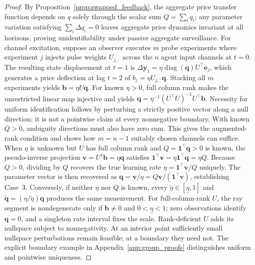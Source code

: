 \documentclass[10pt,twocolumn,letterpaper]{article}
\theoremstyle{definition}
\theoremstyle{remark}
\begin{document}
\begin{proof}
By Proposition~\ref{prop:swapped_feedback}, the aggregate price transfer function depends on $q$ solely through the scalar sum $Q = \sum_i q_i$; any parameter variation satisfying $\sum_i \Delta q_i = 0$ leaves aggregate price dynamics invariant at all horizons, proving unidentifiability under passive aggregate surveillance.
For channel excitation, suppose an observer executes $m$ probe experiments where experiment $j$ injects pulse weights $U_{j,:}$ across the $n$ agent input channels at $t=0$. The resulting state displacement at $t=1$ is $\Delta \mathbf{y}_1 = \eta \operatorname{diag}(\mathbf{q}) U^\top \mathbf{e}_j$, which generates a price deflection at lag $t=2$ of $b_j = \eta U_{j,:} \mathbf{q}$. Stacking all $m$ experiments yields $\mathbf{b} = \eta U \mathbf{q}$.
For known $\eta>0$, full column rank makes the unrestricted linear map injective and yields $\mathbf q=\eta^{-1}(U^\top U)^{-1}U^\top\mathbf b$. Necessity for uniform identification follows by perturbing a strictly positive vector along a null direction; it is not a pointwise claim at every nonnegative boundary. With known $Q>0$, ambiguity directions must also have zero sum. This gives the augmented-rank condition and shows how $m=n-1$ suitably chosen channels can suffice.
When $\eta$ is unknown but $U$ has full column rank and $Q = \mathbf{1}^\top \mathbf{q} > 0$ is known, the pseudo-inverse projection $\mathbf{v} = U^\dagger \mathbf{b} = \eta \mathbf{q}$ satisfies $\mathbf{1}^\top \mathbf{v} = \eta \mathbf{1}^\top \mathbf{q} = \eta Q$. Because $Q > 0$, dividing by $Q$ recovers the true learning rate $\eta = \mathbf{1}^\top \mathbf{v} / Q$ uniquely. The parameter vector is then recovered as $\mathbf{q} = \mathbf{v} / \eta = Q \mathbf{v} / (\mathbf{1}^\top \mathbf{v})$, establishing Case~3.
Conversely, if neither $\eta$ nor $Q$ is known, every $\tilde\eta\in[\underline\eta,1]$ and $\tilde{\mathbf q}=(\eta/\tilde\eta)\mathbf q$ produces the same measurement. For full-column-rank $U$, the ray segment is nondegenerate only if $\mathbf b\ne0$ and $0<\underline\eta<1$; zero observations identify $\mathbf q=0$, and a singleton rate interval fixes the scale. Rank-deficient $U$ adds its nullspace subject to nonnegativity. At an interior point sufficiently small nullspace perturbations remain feasible; at a boundary they need not. The explicit boundary example in Appendix~\ref{app:group_proofs} distinguishes uniform and pointwise uniqueness.
\end{proof}
\end{document}
